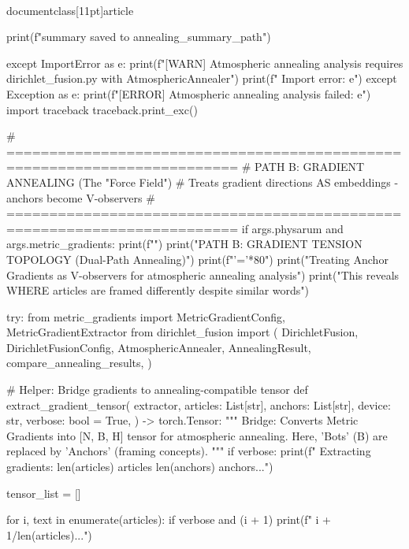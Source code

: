 \\documentclass[11pt]{article}
\begin{document}
\begin{CodeBlock}
            print(f"\nAnnealing summary saved to {annealing_summary_path}")
            
        except ImportError as e:
            print(f"[WARN] Atmospheric annealing analysis requires dirichlet_fusion.py with AtmosphericAnnealer")
            print(f"  Import error: {e}")
        except Exception as e:
            print(f"[ERROR] Atmospheric annealing analysis failed: {e}")
            import traceback
            traceback.print_exc()

    # =========================================================================
    # PATH B: GRADIENT ANNEALING (The "Force Field")
    # Treats gradient directions AS embeddings - anchors become V-observers
    # =========================================================================
    if args.physarum and args.metric_gradients:
        print(f"")
        print("PATH B: GRADIENT TENSION TOPOLOGY (Dual-Path Annealing)")
        print(f"{'='*80}")
        print("Treating Anchor Gradients as V-observers for atmospheric annealing analysis")
        print("This reveals WHERE articles are framed differently despite similar words")
        
        try:
            from metric_gradients import MetricGradientConfig, MetricGradientExtractor
            from dirichlet_fusion import (
                DirichletFusion, DirichletFusionConfig,
                AtmosphericAnnealer, AnnealingResult,
                compare_annealing_results,
            )

            # Helper: Bridge gradients to annealing-compatible tensor
            def extract_gradient_tensor(
                extractor,
                articles: List[str],
                anchors: List[str],
                device: str,
                verbose: bool = True,
            ) -> torch.Tensor:
                """
                Bridge: Converts Metric Gradients into [N, B, H] tensor for atmospheric annealing.
                Here, 'Bots' (B) are replaced by 'Anchors' (framing concepts).
                """
                if verbose:
                    print(f"  Extracting gradients: {len(articles)} articles  {len(anchors)} anchors...")
                
                tensor_list = []
                
                for i, text in enumerate(articles):
                    if verbose and (i + 1) %
                        print(f"    {i + 1}/{len(articles)}...")
                    

\end{CodeBlock}
\end{document}
